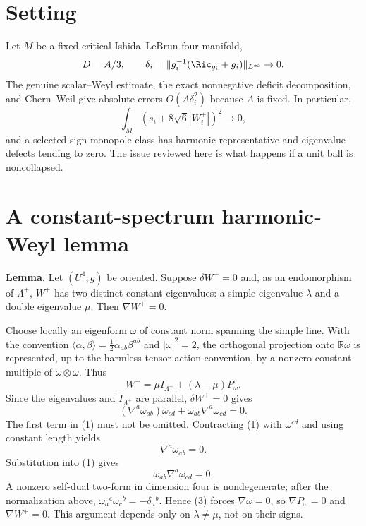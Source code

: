 
\section{Setting}
Let $M$ be a fixed critical Ishida--LeBrun four-manifold,
\[
 D=A/3,
 \qquad
 \delta_i=\|g_i^{-1}(\Ric_{g_i}+g_i)\|_{L^\infty}\to0.
\]
The genuine scalar--Weyl estimate, the exact nonnegative deficit decomposition,
and Chern--Weil give absolute errors $O(A\delta_i^2)$ because $A$ is fixed.  In
particular,
\[
 \int_M(s_i+8\sqrt6|W_i^+|)^2\to0,
\]
and a selected sign monopole class has harmonic representative and eigenvalue
defects tending to zero.  The issue reviewed here is what happens if a unit ball
is noncollapsed.

\section{A constant-spectrum harmonic-Weyl lemma}
\textbf{Lemma.}  Let $(U^4,g)$ be oriented.  Suppose $\delta W^+=0$ and, as an
endomorphism of $\Lambda^+$, $W^+$ has two distinct constant eigenvalues: a
simple eigenvalue $\lambda$ and a double eigenvalue $\mu$.  Then $\nabla W^+=0$.

Choose locally an eigenform $\omega$ of constant norm spanning the simple
line.  With the convention $\langle\alpha,\beta\rangle=\tfrac12
\alpha_{ab}\beta^{ab}$ and $|\omega|^2=2$, the orthogonal projection onto
$\mathbb R\omega$ is represented, up to the harmless tensor-action convention,
by a nonzero constant multiple of $\omega\otimes\omega$.  Thus
\[
 W^+=\mu I_{\Lambda^+}+(\lambda-\mu)P_\omega.
\]
Since the eigenvalues and $I_{\Lambda^+}$ are parallel, $\delta W^+=0$ gives
\[
 (\nabla^a\omega_{ab})\omega_{cd}
   +\omega_{ab}\nabla^a\omega_{cd}=0.                 \tag{1}
\]
The first term in (1) must not be omitted.  Contracting (1) with
$\omega^{cd}$ and using constant length yields
\[
 \nabla^a\omega_{ab}=0.                                \tag{2}
\]
Substitution into (1) gives
\[
 \omega_{ab}\nabla^a\omega_{cd}=0.                    \tag{3}
\]
A nonzero self-dual two-form in dimension four is nondegenerate; after the
normalization above, $\omega_a{}^c\omega_c{}^b=-\delta_a{}^b$.  Hence (3)
forces $\nabla\omega=0$, so $\nabla P_\omega=0$ and $\nabla W^+=0$.  This
argument depends only on $\lambda\ne\mu$, not on their signs.

